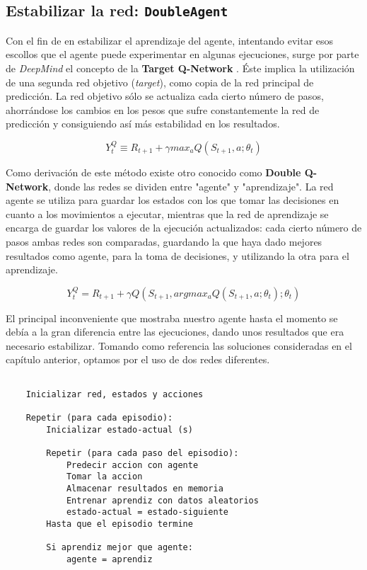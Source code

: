 \subsection{Estabilizar la red: \texttt{DoubleAgent}}

Con el fin de en estabilizar el aprendizaje del agente, intentando evitar esos escollos que el agente puede experimentar en algunas ejecuciones, surge por parte de \textit{DeepMind} el concepto de la \textbf{Target Q-Network} \citep{NIPS2010_3964}. Éste implica la utilización de una segunda red objetivo (\textit{target}), como copia de la red principal de predicción. La red objetivo sólo se actualiza cada cierto número de pasos, ahorrándose los cambios en los pesos que sufre constantemente la red de predicción y consiguiendo así más estabilidad en los resultados.

$$Y^Q_{t} \equiv R_{t+1} + \gamma max_{a} Q(S_{t+1}, a; \theta_{t})$$

Como derivación de este método existe otro conocido como \textbf{Double Q-Network}, donde las redes se dividen entre "agente" y "aprendizaje". La red agente se utiliza para guardar los estados con los que tomar las decisiones en cuanto a los movimientos a ejecutar, mientras que la red de aprendizaje se encarga de guardar los valores de la ejecución actualizados: cada cierto número de pasos ambas redes son comparadas, guardando la que haya dado mejores resultados como agente, para la toma de decisiones, y utilizando la otra para el aprendizaje.

$$Y^Q_{t} = R_{t+1} + \gamma Q(S_{t+1}, argmax_{a} Q(S_{t+1}, a; \theta_{t}); \theta_{t})$$

El principal inconveniente que mostraba nuestro agente hasta el momento se debía a la gran diferencia entre las ejecuciones, dando unos resultados que era necesario estabilizar. Tomando como referencia las soluciones consideradas en el capítulo anterior, optamos por el uso de dos redes diferentes.

\begin{minipage}{0.9\linewidth}%
    \begin{lstlisting}[frame=tb, caption=Pseudocódigo DoubleAgent, inputencoding=latin1, label=code:cartpole_drl4]
    
    Inicializar red, estados y acciones
    
    Repetir (para cada episodio):
        Inicializar estado-actual (s)
        
        Repetir (para cada paso del episodio):
            Predecir accion con agente
            Tomar la accion
            Almacenar resultados en memoria
            Entrenar aprendiz con datos aleatorios
            estado-actual = estado-siguiente
        Hasta que el episodio termine

        Si aprendiz mejor que agente:
            agente = aprendiz
    \end{lstlisting}%
\end{minipage}

